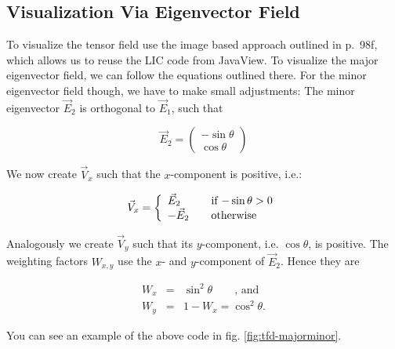 \documentclass[a4paper,10pt,notitlepage]{scrartcl}
\begin{document}
\subsection{Visualization Via Eigenvector Field}

To visualize the tensor field use the image based approach outlined in
\cite{tfd} p.~98f, which allows us to reuse the LIC code from JavaView. To
visualize the major eigenvector field, we can follow the equations outlined
there. For the minor eigenvector field though, we have to make small
adjustments: The minor eigenvector $\vec{E}_2$ is orthogonal to $\vec{E}_1$,
such that

\begin{equation}
 \vec{E}_2 = \left( \begin{array}{c}
              -\sin \theta \\
              \cos \theta
             \end{array} \right)
\end{equation}

We now create $\vec{V}_x$ such that the $x$-component is positive, i.e.:

\begin{equation}
 \vec{V}_x = \left \{  \begin{array}{l l}
                       \vec{E}_2 & \quad \text{if $-\sin \theta > 0$} \\
                       -\vec{E}_2 & \quad \text{otherwise}
                       \end{array} \right.
\end{equation}

Analogously we create $\vec{V}_y$ such that its $y$-component, i.e. $\cos
\theta$, is positive. The weighting factors $W_{x,y}$ use the $x$- and
$y$-component of $\vec{E}_2$. Hence they are

\begin{eqnarray}
 W_x &=& \sin^2 \theta \qquad \text{, and}\\
 W_y &=& 1 - W_x = \cos^2 \theta .
\end{eqnarray}

You can see an example of the above code in fig. \ref{fig:tfd-majorminor}.
\end{document}
